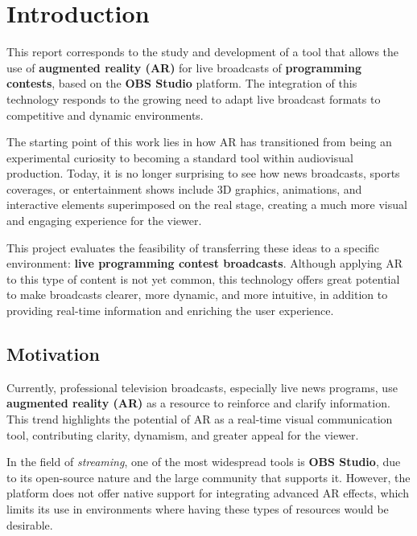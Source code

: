 \chapter{Introduction}
\label{cap:introduction}


This report corresponds to the study and development of a tool that allows the use of \textbf{augmented reality (AR)} for live broadcasts of \textbf{programming contests}, based on the \textbf{OBS Studio} platform. The integration of this technology responds to the growing need to adapt live broadcast formats to competitive and dynamic environments.
    
    The starting point of this work lies in how AR has transitioned from being an experimental curiosity to becoming a standard tool within audiovisual production. Today, it is no longer surprising to see how news broadcasts, sports coverages, or entertainment shows include 3D graphics, animations, and interactive elements superimposed on the real stage, creating a much more visual and engaging experience for the viewer.

This project evaluates the feasibility of transferring these ideas to a specific environment: \textbf{live programming contest broadcasts}. Although applying AR to this type of content is not yet common, this technology offers great potential to make broadcasts clearer, more dynamic, and more intuitive, in addition to providing real-time information and enriching the user experience.
    
    \section{Motivation}
    
    Currently, professional television broadcasts, especially live news programs, use \textbf{augmented reality (AR)} as a resource to reinforce and clarify information. This trend highlights the potential of AR as a real-time visual communication tool, contributing clarity, dynamism, and greater appeal for the viewer.
    
    In the field of \textit{streaming}, one of the most widespread tools is \textbf{OBS Studio}, due to its open-source nature and the large community that supports it. However, the platform does not offer native support for integrating advanced AR effects, which limits its use in environments where having these types of resources would be desirable.
    

